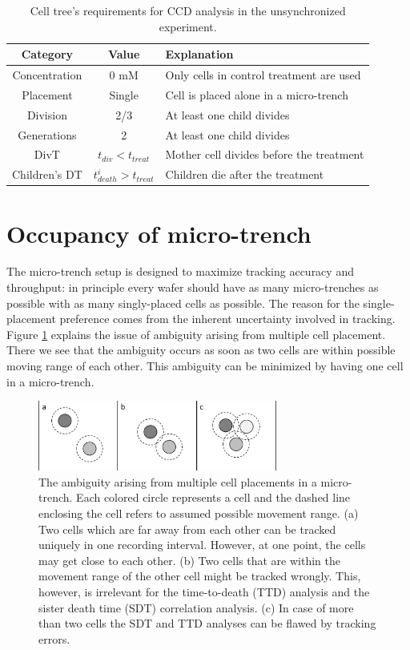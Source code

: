\documentclass[pdftex,12pt,a4paper]{report}
\begin{document}
\begin{table}[H]
\centering
\begin{tabular}{ c | c | l }
\hline
Category & Value & Explanation \\
\hline\hline
Concentration & 0 mM & Only cells in control treatment are used\\
Placement & Single & Cell is placed alone in a micro-trench \\
Division & 2/3 & At least one child divides\\
Generations & 2 & At least one child divides \\
DivT & $t_{div} < t_{treat}$ & Mother cell divides before the treatment\\
Children's DT & $t^i_{death} > t_{treat}$  & Children die after the treatment\\
\hline
\end{tabular}
\caption[Cell tree's requirements for CCD analysis in the unsynchronized experiment]{Cell tree's requirements for CCD analysis in the unsynchronized experiment.}
\label{table:cell_reqs_ccd}
\end{table}

\section{Occupancy of micro-trench}
\label{section:occupancy_of_microtrench}

The micro-trench setup is designed to maximize tracking accuracy and throughput: in principle every wafer should have as many micro-trenches as possible with as many singly-placed cells as possible. The reason for the single-placement preference comes from the inherent uncertainty involved in tracking. Figure \ref{fig:cell_placements} explains the issue of ambiguity arising from multiple cell placement. There we see that the ambiguity occurs as soon as two cells are within possible moving range of each other. This ambiguity can be minimized by having one cell in a micro-trench.

\begin{figure}[H]
\centering
\includegraphics[width=0.7\textwidth]{images/cells_confusion.pdf}
\caption[Illustration of SVM in 2D]{The ambiguity arising from multiple cell placements in a micro-trench.  Each colored circle represents a cell and the dashed line enclosing the cell refers to assumed possible movement range. (a) Two cells which are far away from each other can be tracked uniquely in one recording interval. However, at one point, the cells may get close to each other. (b) Two cells that are within the movement range of the other cell might be tracked wrongly. This, however, is irrelevant for the time-to-death (TTD) analysis and  the sister death time (SDT) correlation analysis. (c) In case of more than two cells the SDT and TTD analyses can be flawed by tracking errors.}
\label{fig:cell_placements}
\end{figure}
\end{document}
